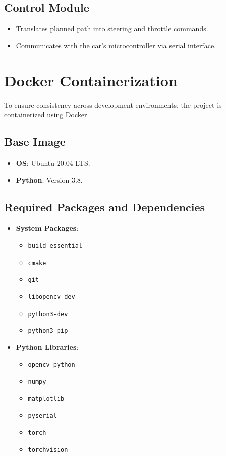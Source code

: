 \documentclass[12pt]{article}
\begin{document}
\subsection{Control Module}

\begin{itemize}[leftmargin=*, label={--}]
  \item Translates planned path into steering and throttle commands.
  \item Communicates with the car's microcontroller via serial interface.
\end{itemize}

\section{Docker Containerization}

To ensure consistency across development environments, the project is containerized using Docker.

\subsection{Base Image}

\begin{itemize}[leftmargin=*, label={--}]
  \item \textbf{OS}: Ubuntu 20.04 LTS.
  \item \textbf{Python}: Version 3.8.
\end{itemize}

\subsection{Required Packages and Dependencies}

\begin{itemize}[leftmargin=*, label={--}]
  \item \textbf{System Packages}:
    \begin{itemize}
      \item \texttt{build-essential}
      \item \texttt{cmake}
      \item \texttt{git}
      \item \texttt{libopencv-dev}
      \item \texttt{python3-dev}
      \item \texttt{python3-pip}
    \end{itemize}
  \item \textbf{Python Libraries}:
    \begin{itemize}
      \item \texttt{opencv-python}
      \item \texttt{numpy}
      \item \texttt{matplotlib}
      \item \texttt{pyserial}
      \item \texttt{torch}
      \item \texttt{torchvision}
    \end{itemize}
\end{itemize}
\end{document}
